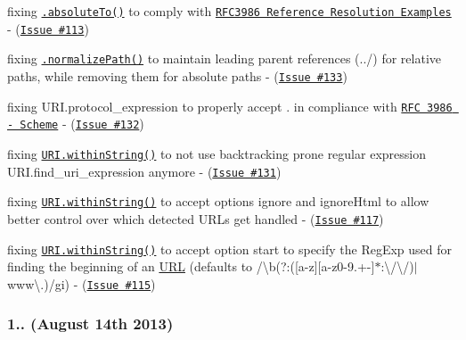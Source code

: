 \begin{DoxyItemize}
\item fixing \href{http://medialize.github.io/URI.js/docs.html#absoluteto}{\tt {\ttfamily .absolute\+To()}} to comply with \href{http://tools.ietf.org/html/rfc3986#section-5.4}{\tt R\+F\+C3986 Reference Resolution Examples} -\/ (\href{https://github.com/medialize/URI.js/issues/113}{\tt Issue \#113})
\item fixing \href{http://medialize.github.io/URI.js/docs.html#normalize-path}{\tt {\ttfamily .normalize\+Path()}} to maintain leading parent references ({\ttfamily ../}) for relative paths, while removing them for absolute paths -\/ (\href{https://github.com/medialize/URI.js/issues/133}{\tt Issue \#133})
\item fixing {\ttfamily U\+R\+I.\+protocol\+\_\+expression} to properly accept {\ttfamily .} in compliance with \href{http://tools.ietf.org/html/rfc3986#section-3.1}{\tt R\+FC 3986 -\/ Scheme} -\/ (\href{https://github.com/medialize/URI.js/issues/132}{\tt Issue \#132})
\item fixing \href{http://medialize.github.io/URI.js/docs.html#static-withinString}{\tt {\ttfamily U\+R\+I.\+within\+String()}} to not use backtracking prone regular expression {\ttfamily U\+R\+I.\+find\+\_\+uri\+\_\+expression} anymore -\/ (\href{https://github.com/medialize/URI.js/issues/131}{\tt Issue \#131})
\item fixing \href{http://medialize.github.io/URI.js/docs.html#static-withinString}{\tt {\ttfamily U\+R\+I.\+within\+String()}} to accept options {\ttfamily ignore} and {\ttfamily ignore\+Html} to allow better control over which detected U\+R\+Ls get handled -\/ (\href{https://github.com/medialize/URI.js/issues/117}{\tt Issue \#117})
\item fixing \href{http://medialize.github.io/URI.js/docs.html#static-withinString}{\tt {\ttfamily U\+R\+I.\+within\+String()}} to accept option {\ttfamily start} to specify the Reg\+Exp used for finding the beginning of an \mbox{\hyperlink{namespace_u_r_l}{U\+RL}} (defaults to {\ttfamily /\textbackslash{}b(?\+:(\mbox{[}a-\/z\mbox{]}\mbox{[}a-\/z0-\/9.+-\/\mbox{]}$\ast$\+:\textbackslash{}/\textbackslash{}/)$\vert$www\textbackslash{}.)/gi}) -\/ (\href{https://github.com/medialize/URI.js/issues/115}{\tt Issue \#115})
\end{DoxyItemize}

\subsubsection*{1.. (August 14th 2013)}


